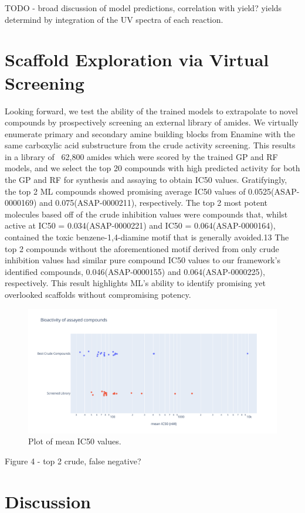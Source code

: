 TODO - broad discussion of model predictions, correlation with yield?
yields determind by integration of the UV spectra of each reaction.

\section{Scaffold Exploration via Virtual Screening}

Looking forward, we test the ability of the trained models to extrapolate to novel compounds by prospectively screening an external library of amides. We virtually enumerate primary and secondary amine building blocks from Enamine with the same carboxylic acid substructure from the crude activity screening. This results in a library of ~62,800 amides which were scored by the trained GP and RF models, and we select the top 20 compounds with high predicted activity for both the GP and RF for synthesis and assaying to obtain IC50 values. Gratifyingly, the top 2 ML compounds showed promising average IC50 values of 0.0525\uM (ASAP-0000169) and 0.075\uM (ASAP-0000211), respectively. The top 2 most potent molecules based off of the crude inhibition values were compounds that, whilst active at IC50 = 0.034\uM (ASAP-0000221) and IC50 = 0.064\uM (ASAP-0000164), contained the toxic benzene-1,4-diamine motif that is generally avoided.13 The top 2 compounds without the aforementioned motif derived from only crude inhibition values had similar pure compound IC50 values to our framework's identified compounds, 0.046\uM (ASAP-0000155) and 0.064\uM (ASAP-0000225), respectively. This result highlights ML's ability to identify promising yet overlooked scaffolds without compromising potency. 

\begin{figure}
    \centering
             \includegraphics[width=\textwidth]{Chapters/Crude/Figs/strip_plot.pdf}
        \caption{Plot of mean IC50 values.}
        \label{fig:strip}
    \end{figure}

Figure 4 - top 2 crude, false negative?

\section{Discussion}